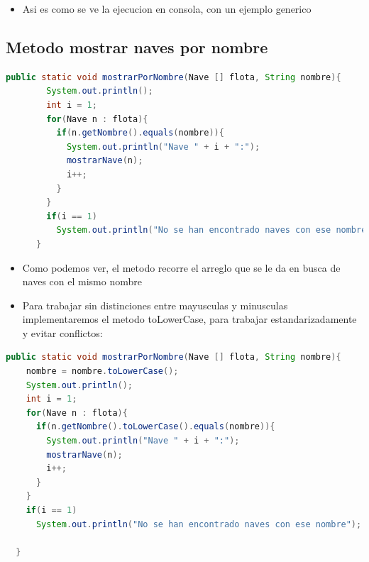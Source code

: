 \documentclass{article}
\begin{document}
    \begin{itemize}
        \item Asi es como se ve la ejecucion en consola, con un ejemplo generico
    \end{itemize}

    
        \subsection{Metodo mostrar naves por nombre}
        \begin{lstlisting}[language=java, caption={Metodo mostrarPorNombre}]
    public static void mostrarPorNombre(Nave [] flota, String nombre){
        System.out.println();
        int i = 1;
        for(Nave n : flota){
          if(n.getNombre().equals(nombre)){
            System.out.println("Nave " + i + ":");
            mostrarNave(n);
            i++;
          }
        }
        if(i == 1)
          System.out.println("No se han encontrado naves con ese nombre");
      }
        \end{lstlisting}
        \begin{itemize}
            \item Como podemos ver, el metodo recorre el arreglo que se le da en busca de naves con el mismo nombre
            \item Para trabajar sin distinciones entre mayusculas y minusculas implementaremos el metodo toLowerCase, para trabajar estandarizadamente y evitar conflictos:
        \end{itemize}
        \begin{lstlisting}[language=java, caption={Metodo mostrarPorNombre}]
  public static void mostrarPorNombre(Nave [] flota, String nombre){
    nombre = nombre.toLowerCase();
    System.out.println();
    int i = 1;
    for(Nave n : flota){
      if(n.getNombre().toLowerCase().equals(nombre)){
        System.out.println("Nave " + i + ":");
        mostrarNave(n);
        i++;
      }
    }
    if(i == 1)
      System.out.println("No se han encontrado naves con ese nombre");

  }
        \end{lstlisting}
\end{document}
